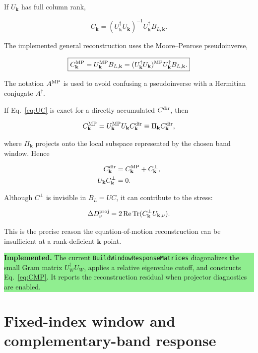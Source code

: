 \documentclass[11pt]{article}
\numberwithin{equation}{section}
\newcommand{\Tr}{\operatorname{Tr}}
\newcommand{\Ree}{\operatorname{Re}}
\newcommand{\kb}{\mathbf k}
\newcommand{\code}[1]{\texttt{#1}}
\newcommand{\status}[2]{\par\medskip\noindent\colorbox{#1}{\parbox{0.965\linewidth}{#2}}\par\medskip}
\newcommand{\implemented}[1]{\status{lightgreen}{\textbf{Implemented.} #1}}
\begin{document}
If $U_{\kb}$ has full column rank,

\begin{equation}
 C_{\kb}=(U_{\kb}^\dagger U_{\kb})^{-1}
 U_{\kb}^\dagger B_{L,\kb}.
\end{equation}

The implemented general reconstruction uses the Moore--Penrose pseudoinverse,

\begin{equation}
 \boxed{
 C_{\kb}^{\rm MP}=U_{\kb}^{\rm MP}B_{L,\kb}
 =(U_{\kb}^\dagger U_{\kb})^{\rm MP}
 U_{\kb}^\dagger B_{L,\kb}.}
 \label{eq:CMP}
\end{equation}

The notation $A^{\rm MP}$ is used to avoid confusing a pseudoinverse with a
Hermitian conjugate $A^\dagger$.

If Eq.~\eqref{eq:UC} is exact for a directly accumulated $C^{\rm dir}$, then

\begin{equation}
 C_{\kb}^{\rm MP}
 =U_{\kb}^{\rm MP}U_{\kb}C_{\kb}^{\rm dir}
 \equiv\Pi_{\kb}C_{\kb}^{\rm dir},
\end{equation}

where $\Pi_{\kb}$ projects onto the local subspace represented by the chosen
band window.  Hence

\begin{align}
 C_{\kb}^{\rm dir}&=C_{\kb}^{\rm MP}+C_{\kb}^{\perp},\\
 U_{\kb}C_{\kb}^{\perp}&=0.
\end{align}

Although $C^\perp$ is invisible in $B_L=UC$, it can contribute to the stress:

\begin{equation}
 \Delta D_\nu^{\rm proj}
 =2\Ree\Tr(C_{\kb}^{\perp}U_{\kb,\nu}).
 \label{eq:nullstress}
\end{equation}

This is the precise reason the equation-of-motion reconstruction can be
insufficient at a rank-deficient $\kb$ point.

\implemented{The current \code{BuildWindowResponseMatrices} diagonalizes the
small Gram matrix $U_W^\dagger U_W$, applies a relative eigenvalue cutoff, and
constructs Eq.~\eqref{eq:CMP}.  It reports the reconstruction residual when
projector diagnostics are enabled.}

\section{Fixed-index window and complementary-band response}
\label{sec:window}
\end{document}

